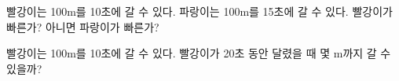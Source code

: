 \documentclass[a4paper,15pt]{exam}
\begin{document}
\begin{questions}
\answerline

\question
빨강이는 100m를 10초에 갈 수 있다. 파랑이는 100m를 15초에 갈 수 있다. 빨강이가 빠른가? 아니면 파랑이가 빠른가?
\answerline

\question
빨강이는 100m를 10초에 갈 수 있다. 빨강이가 20초 동안 달렸을 때 몇 m까지 갈 수 있을까?
\answerline

\end{questions}
\end{document}
